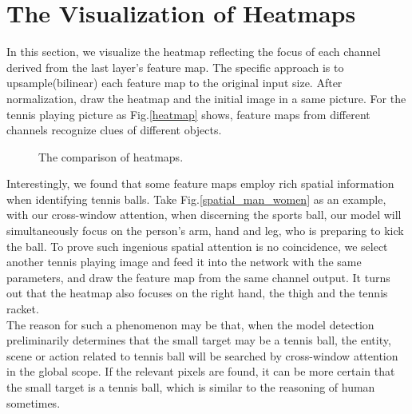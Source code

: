 \documentclass{article} \usepackage[numbers,sort&compress]{natbib}
\begin{document}
\section{The Visualization of Heatmaps}
In this section, we visualize the heatmap \cite{woo2018cbam} reflecting the focus of each channel derived from the last layer's feature map. The specific approach is to upsample(bilinear) each feature map to the original input size. After normalization, draw the heatmap and the initial image in a same picture. For the tennis playing picture as Fig.\textcolor{red}{\ref{heatmap}} shows, feature maps from different channels recognize clues of different objects.\\
\begin{figure}[h]
\begin{center}
\caption{The comparison of heatmaps.}
\label{all_heatmap}
\end{center}
\end{figure}
Interestingly, we found that some feature maps employ rich spatial information when identifying tennis balls. Take Fig.\textcolor{red}{\ref{spatial_man_women}} as an example, with our cross-window attention, when discerning the sports ball, our model will simultaneously focus on the person's arm, hand and leg, who is preparing to kick the ball. To prove such ingenious spatial attention is no coincidence, we select another tennis playing image and feed it into the network with the same parameters, and draw the feature map from the same channel output. It turns out that the heatmap also 
focuses on the right hand, the thigh and the tennis racket. \\
The reason for such a phenomenon may be that, when the model detection preliminarily determines that the small target may be a tennis ball, the entity, scene or action related to tennis ball will be searched by cross-window attention in the global scope. If the relevant pixels are found, it can be more certain that the small target is a tennis ball, which is similar to the reasoning of human sometimes.
\end{document}
